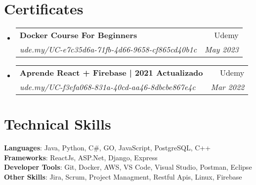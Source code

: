 \documentclass[letterpaper,11pt]{article}
\makeatletter
\newcommand{\resumeItem}[1]{
  \item\small{
    {#1 \vspace{-2pt}}
  }
}
\newcommand{\resumeSubheading}[4]{
  \vspace{-2pt}\item
    \begin{tabular*}{0.97\textwidth}[t]{l@{\extracolsep{\fill}}r}
      \textbf{#1} & #2 \\
      \textit{\small#3} & \textit{\small #4} \\
    \end{tabular*}\vspace{-7pt}
}
\newcommand{\resumeSubSubheading}[2]{
    \item
    \begin{tabular*}{0.97\textwidth}{l@{\extracolsep{\fill}}r}
      \textit{\small#1} & \textit{\small #2} \\
    \end{tabular*}\vspace{-7pt}
}
\newcommand{\resumeSubHeadingListStart}{\begin{itemize}[leftmargin=0.15in, label={}]}
\newcommand{\resumeSubHeadingListEnd}{\end{itemize}}
\newcommand{\resumeItemListStart}{\begin{itemize}}
\newcommand{\resumeItemListEnd}{\end{itemize}\vspace{-5pt}}
\makeatother
\begin{document}


\section{Certificates}



  \resumeSubHeadingListStart
    \resumeSubheading
      {Docker Course For Beginners}{Udemy}
      {ude.my/UC-e7c35d6a-71fb-4d66-9658-cf865cd40b1c}{May 2023}
  \resumeSubHeadingListEnd

  \resumeSubHeadingListStart
    \resumeSubheading
      {Aprende React + Firebase | 2021 Actualizado
}{Udemy}
      {ude.my/UC-f3efa068-831a-40cd-aa46-8dbcbe867e4c}{Mar 2022}
  \resumeSubHeadingListEnd


%

\section{Technical Skills}
 \begin{itemize}[leftmargin=0.15in, label={}]
    \small{\item{
     \textbf{Languages}{: Java, Python, C\#, GO, JavaScript, PostgreSQL, C++} \\
     \textbf{Frameworks}{: ReactJs, ASP.Net, Django, Express} \\
     \textbf{Developer Tools}{: Git, Docker, AWS, VS Code, Visual Studio, Postman, Eclipse} \\
     \textbf{Other Skills}{: Jira, Scrum, Project Managment, Restful Apis, Linux, Firebase}
    }}
 \end{itemize}


\end{document}
